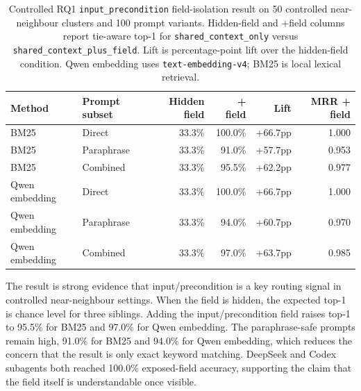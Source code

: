 \begin{table}[H]
\centering
\scriptsize
\setlength{\tabcolsep}{2pt}
\begin{tabular}{p{}p{}rrrr}
\toprule
Method & Prompt subset & Hidden field & + field & Lift & MRR + field \\
\midrule
BM25 & Direct & 33.3\% & 100.0\% & +66.7pp & 1.000 \\
BM25 & Paraphrase & 33.3\% & 91.0\% & +57.7pp & 0.953 \\
BM25 & Combined & 33.3\% & 95.5\% & +62.2pp & 0.977 \\
Qwen embedding & Direct & 33.3\% & 100.0\% & +66.7pp & 1.000 \\
Qwen embedding & Paraphrase & 33.3\% & 94.0\% & +60.7pp & 0.970 \\
Qwen embedding & Combined & 33.3\% & 97.0\% & +63.7pp & 0.985 \\
\bottomrule
\end{tabular}
\caption{Controlled RQ1 \texttt{input\_precondition} field-isolation result on 50 controlled near-neighbour clusters and 100 prompt variants. Hidden-field and +field columns report tie-aware top-1 for \texttt{shared\_context\_only} versus \texttt{shared\_context\_plus\_field}. Lift is percentage-point lift over the hidden-field condition. Qwen embedding uses \texttt{text-embedding-v4}; BM25 is local lexical retrieval.}
\label{tab:rq1a-input-precondition-isolation}
\end{table}

The result is strong evidence that input/precondition is a key routing signal in controlled near-neighbour settings. When the field is hidden, the expected top-1 is chance level for three siblings. Adding the input/precondition field raises top-1 to 95.5\% for BM25 and 97.0\% for Qwen embedding. The paraphrase-safe prompts remain high, 91.0\% for BM25 and 94.0\% for Qwen embedding, which reduces the concern that the result is only exact keyword matching. DeepSeek and Codex subagents both reached 100.0\% exposed-field accuracy, supporting the claim that the field itself is understandable once visible.

